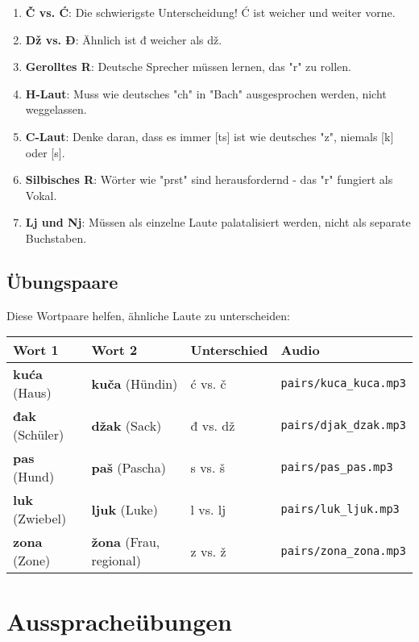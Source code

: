 \begin{enumerate}
    \item \textbf{Č vs. Ć}: Die schwierigste Unterscheidung! Ć ist weicher und weiter vorne.
    \item \textbf{Dž vs. Đ}: Ähnlich ist đ weicher als dž.
    \item \textbf{Gerolltes R}: Deutsche Sprecher müssen lernen, das "r" zu rollen.
    \item \textbf{H-Laut}: Muss wie deutsches "ch" in "Bach" ausgesprochen werden, nicht weggelassen.
    \item \textbf{C-Laut}: Denke daran, dass es immer [ts] ist wie deutsches "z", niemals [k] oder [s].
    \item \textbf{Silbisches R}: Wörter wie "prst" sind herausfordernd - das "r" fungiert als Vokal.
    \item \textbf{Lj und Nj}: Müssen als einzelne Laute palatalisiert werden, nicht als separate Buchstaben.
\end{enumerate}

\subsection{Übungspaare}

Diese Wortpaare helfen, ähnliche Laute zu unterscheiden:

\begin{center}
\begin{tabular}{llll}
\toprule
\textbf{Wort 1} & \textbf{Wort 2} & \textbf{Unterschied} & \textbf{Audio} \\
\midrule
\textbf{kuća} (Haus) & \textbf{kuča} (Hündin) & ć vs. č & \small\texttt{pairs/kuca\_kuca.mp3} \\
\textbf{đak} (Schüler) & \textbf{džak} (Sack) & đ vs. dž & \small\texttt{pairs/djak\_dzak.mp3} \\
\textbf{pas} (Hund) & \textbf{paš} (Pascha) & s vs. š & \small\texttt{pairs/pas\_pas.mp3} \\
\textbf{luk} (Zwiebel) & \textbf{ljuk} (Luke) & l vs. lj & \small\texttt{pairs/luk\_ljuk.mp3} \\
\textbf{zona} (Zone) & \textbf{žona} (Frau, regional) & z vs. ž & \small\texttt{pairs/zona\_zona.mp3} \\
\bottomrule
\end{tabular}
\end{center}

\section{Ausspracheübungen}

